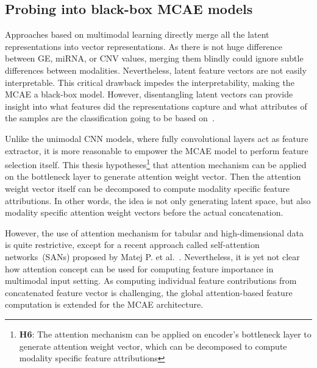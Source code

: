 \subsection{Probing into black-box MCAE models}
Approaches based on multimodal learning directly merge all the latent representations into vector representations. As there is not huge difference between GE, miRNA, or CNV values, merging them blindly could ignore subtle differences between modalities. 
Nevertheless, latent feature vectors are not easily interpretable. This critical drawback impedes the interpretability, making the MCAE a black-box model. However, disentangling latent vectors can provide insight into what features did the representations capture and what attributes of the samples are the classification going to be based on~\cite{karimTCBB2020}. 

\hspace*{3.5mm} Unlike the unimodal CNN models, where fully convolutional layers act as feature extractor, it is more reasonable to empower the MCAE model to perform feature selection itself. This thesis hypotheses\footnote{\textbf{H6}: The attention mechanism can be applied on encoder's bottleneck layer to generate attention weight vector, which can be decomposed to compute modality specific feature attributions} that attention mechanism can be applied on the bottleneck layer to generate attention weight vector. Then the attention weight vector itself can be decomposed to compute modality specific feature attributions. In other words, the idea is not only generating latent space, but also modality specific attention weight vectors before the actual concatenation. %

\hspace*{3.5mm} However, the use of attention mechanism for tabular and high-dimensional data is quite restrictive, except for a recent approach called self-attention networks~(SANs) proposed by Matej P. et al.~\cite{vskrlj2020feature}. Nevertheless, it is yet not clear how attention concept can be used for computing feature importance in multimodal input setting.
As computing individual feature contributions from concatenated feature vector is challenging, the global attention-based feature computation is extended for the MCAE architecture. 

